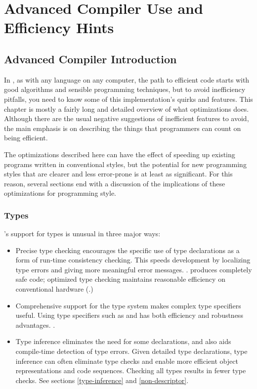 \chapter{Advanced Compiler Use and Efficiency Hints}
\label{advanced-compiler}



\section{Advanced Compiler Introduction}

In \cmucl{}, as with any language on any computer, the path to efficient
code starts with good algorithms and sensible programming techniques,
but to avoid inefficiency pitfalls, you need to know some of this
implementation's quirks and features.  This chapter is mostly a fairly
long and detailed overview of what optimizations \python{} does.
Although there are the usual negative suggestions of inefficient
features to avoid, the main emphasis is on describing the things that
programmers can count on being efficient.

The optimizations described here can have the effect of speeding up
existing programs written in conventional styles, but the potential
for new programming styles that are clearer and less error-prone is at
least as significant.  For this reason, several sections end with a
discussion of the implications of these optimizations for programming
style.



\subsection{Types}

\python{}'s support for types is unusual in three major ways:
\begin{itemize}
  
\item Precise type checking encourages the specific use of type
  declarations as a form of run-time consistency checking.  This
  speeds development by localizing type errors and giving more
  meaningful error messages.  .  \python{}
  produces completely safe code; optimized type checking maintains
  reasonable efficiency on conventional hardware
  (.)
  
\item Comprehensive support for the \clisp{} type system makes complex
  type specifiers useful.  Using type specifiers such as  and
   has both efficiency and robustness advantages.
  .
  
\item Type inference eliminates the need for some declarations, and
  also aids compile-time detection of type errors.  Given detailed
  type declarations, type inference can often eliminate type checks
  and enable more efficient object representations and code sequences.
  Checking all types results in fewer type checks.  See sections
  \ref{type-inference} and \ref{non-descriptor}.
\end{itemize}


